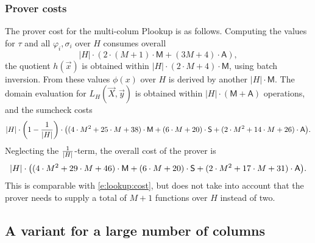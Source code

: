 \documentclass[11pt]{article}
\theoremstyle{definition}
\theoremstyle{remark}
\begin{document}
\subsubsection*{Prover costs}

The prover cost for the multi-colum Plookup is as follows.
Computing the values for $\tau$ and all $\varphi_i,  \sigma_i$ over $H$ consumes overall
\[
|H|\cdot (2\cdot(M+1)\cdot \mathsf M + (3 M+ 4)\cdot \mathsf A),
\]
the quotient $h(\vec x)$ is obtained within $|H|\cdot (2\cdot M + 4)\cdot\mathsf M$, using batch inversion.
From these values $\phi(x)$ over $H$ is derived by another  $|H|\cdot \mathsf M$.
The domain evaluation for $L_H(\vec X, \vec y)$ is obtained within $|H|\cdot (\mathsf M + \mathsf A)$ operations, and the sumcheck costs
\begin{equation*}
|H| \cdot \left(1-\frac{1}{|H|}\right)\cdot \big((4\cdot M^2 + 25\cdot M + 38)\cdot \mathsf M +  (6\cdot M + 20)\cdot\textsf S + (2\cdot M^2 + 14\cdot M + 26) \cdot \textsf A\big).
\end{equation*}
Neglecting the $\nicefrac{1}{|H|}$-term, the overall cost of the prover is 
\begin{equation}
\label{e:hyperplonk:cost}
|H| \cdot  \big((4\cdot M^2 + 29\cdot M + 46)\cdot \mathsf M +  (6\cdot M + 20)\cdot\textsf S + (2\cdot M^2 + 17\cdot M + 31) \cdot \textsf A\big).
\end{equation}
This is comparable with \eqref{e:lookup:cost}, but does not take into account that the prover needs to supply a total of $M+1$ functions over $H$ instead of two. 


\subsection{A variant for a large number of columns}
\label{s:hyperplonk:large}
\end{document}
